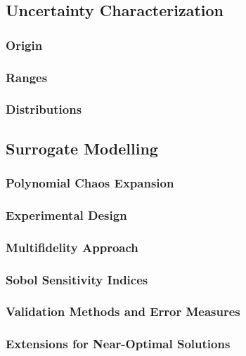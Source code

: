 \subsection{Uncertainty Characterization}
\label{sec:uncertainty}



\subsubsection{Origin}



\subsubsection{Ranges}



\subsubsection{Distributions}




\subsection{Surrogate Modelling}
\label{sec:surrogate}



\subsubsection{Polynomial Chaos Expansion}



\subsubsection{Experimental Design}



\subsubsection{Multifidelity Approach}



\subsubsection{Sobol Sensitivity Indices}



\subsubsection{Validation Methods and Error Measures}



\subsubsection{Extensions for Near-Optimal Solutions}